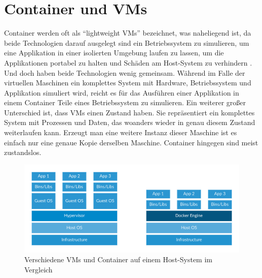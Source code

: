 \chapter{Container und VMs}

Container werden oft als “lightweight VMs” bezeichnet, was naheliegend ist, da beide Technologien darauf ausgelegt sind ein Betriebssystem zu simulieren, um eine Applikation in einer isolierten Umgebung laufen zu lassen, um die Applikationen portabel zu halten und Schäden am Host-System zu verhindern \cite{docker:cvsvm}.
Und doch haben beide Technologien wenig gemeinsam. Während im Falle der virtuellen Maschinen ein komplettes System mit Hardware, Betriebssystem und Applikation simuliert wird, reicht es für das Ausführen einer Applikation in einem Container Teile eines Betriebssystem zu simulieren.
Ein weiterer großer Unterschied ist, dass VMs einen Zustand haben. Sie repräsentiert ein komplettes System mit Prozessen und Daten, das woanders wieder in genau diesem Zustand weiterlaufen kann. Erzeugt man eine weitere Instanz dieser Maschine ist es einfach nur eine genaue Kopie derselben Maschine. Container hingegen sind meist zustandslos.\\

\begin{figure}[!ht]
  \centering
  \includegraphics[width=1\textwidth]{images/container-vm.png}
  \caption{Verschiedene VMs und Container auf einem Host-System im Vergleich \cite{docker}}
\end{figure}


